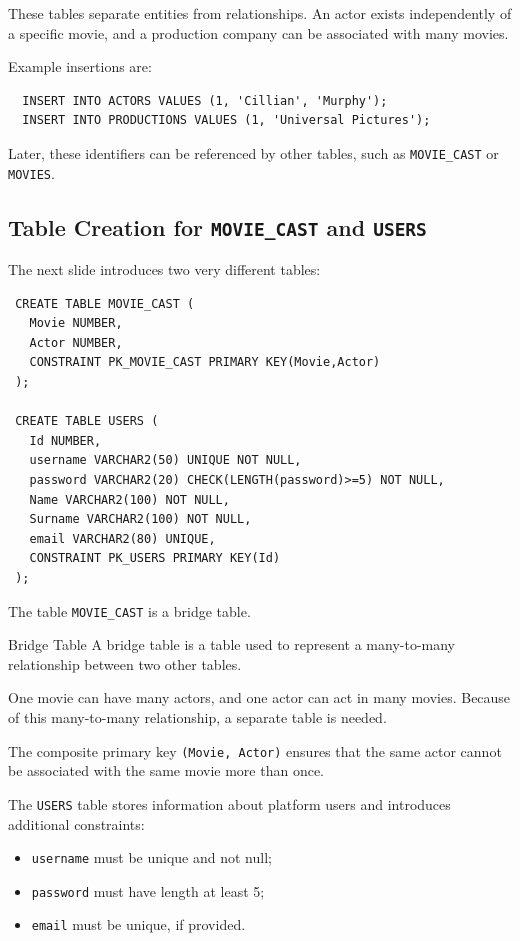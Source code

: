  These tables separate entities from relationships. An actor exists independently of a specific movie, and a production company can be associated with many movies.

 \begin{example}
  Example insertions are:
  \begin{verbatim}
  INSERT INTO ACTORS VALUES (1, 'Cillian', 'Murphy');
  INSERT INTO PRODUCTIONS VALUES (1, 'Universal Pictures');
  \end{verbatim}
  \vspace{-0.4cm}

  Later, these identifiers can be referenced by other tables, such as \texttt{MOVIE\_CAST} or \texttt{MOVIES}.
 \end{example}

 \subsection{Table Creation for \texttt{MOVIE\_CAST} and \texttt{USERS}}

 The next slide introduces two very different tables:

 \begin{verbatim}
 CREATE TABLE MOVIE_CAST (
   Movie NUMBER,
   Actor NUMBER,
   CONSTRAINT PK_MOVIE_CAST PRIMARY KEY(Movie,Actor)
 );

 CREATE TABLE USERS (
   Id NUMBER,
   username VARCHAR2(50) UNIQUE NOT NULL,
   password VARCHAR2(20) CHECK(LENGTH(password)>=5) NOT NULL,
   Name VARCHAR2(100) NOT NULL,
   Surname VARCHAR2(100) NOT NULL,
   email VARCHAR2(80) UNIQUE,
   CONSTRAINT PK_USERS PRIMARY KEY(Id)
 );
 \end{verbatim}
 \vspace{-0.4cm}

 The table \texttt{MOVIE\_CAST} is a bridge table.

 \begin{defbox}{Bridge Table}
  A bridge table is a table used to represent a many-to-many relationship between two other tables.
 \end{defbox}

 One movie can have many actors, and one actor can act in many movies. Because of this many-to-many relationship, a separate table is needed.

 The composite primary key \texttt{(Movie, Actor)} ensures that the same actor cannot be associated with the same movie more than once.

 The \texttt{USERS} table stores information about platform users and introduces additional constraints:
 \begin{itemize}
  \item \texttt{username} must be unique and not null;
  \item \texttt{password} must have length at least 5;
  \item \texttt{email} must be unique, if provided.
 \end{itemize}

